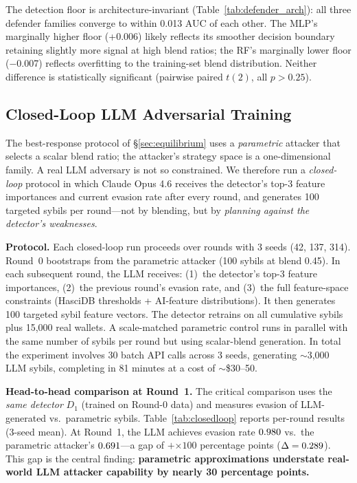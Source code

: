 \documentclass[sigconf,nonacm=false]{acmart}
\begin{document}
The detection floor is architecture-invariant (Table~\ref{tab:defender_arch}): all three defender families converge to within 0.013 AUC of each other. The MLP's marginally higher floor (+0.006) likely reflects its smoother decision boundary retaining slightly more signal at high blend ratios; the RF's marginally lower floor ($-$0.007) reflects overfitting to the training-set blend distribution. Neither difference is statistically significant (pairwise paired $t(2)$, all $p > 0.25$).

\subsection{Closed-Loop LLM Adversarial Training}
\label{sec:closedloop}

The best-response protocol of \S\ref{sec:equilibrium} uses a \emph{parametric} attacker that selects a scalar blend ratio; the attacker's strategy space is a one-dimensional family.
A real LLM adversary is not so constrained.
We therefore run a \emph{closed-loop} protocol in which Claude Opus 4.6 receives the detector's top-3 feature importances and current evasion rate after every round, and generates 100 targeted sybils per round---not by blending, but by \textit{planning against the detector's weaknesses}.

\noindent\textbf{Protocol.}
Each closed-loop run proceeds over \bestResponseNRounds{} rounds with 3 seeds (42, 137, 314).
Round~0 bootstraps from the parametric attacker (100 sybils at blend 0.45).
In each subsequent round, the LLM receives:
(1)~the detector's top-3 feature importances,
(2)~the previous round's evasion rate, and
(3)~the full feature-space constraints (HasciDB thresholds + AI-feature distributions).
It then generates 100 targeted sybil feature vectors.
The detector retrains on all cumulative sybils plus 15,000 real wallets.
A scale-matched parametric control runs in parallel with the same number of sybils per round but using scalar-blend generation.
In total the experiment involves 30 batch API calls across 3 seeds, generating ${\sim}$3,000 LLM sybils, completing in 81 minutes at a cost of ${\sim}$\$30--50.

\noindent\textbf{Head-to-head comparison at Round~1.}
The critical comparison uses the \emph{same detector} $D_1$ (trained on Round-0 data) and measures evasion of LLM-generated vs.\ parametric sybils.
Table~\ref{tab:closedloop} reports per-round results (3-seed mean).
At Round~1, the LLM achieves evasion rate $0.980{}$ vs.\ the parametric attacker's $0.691{}$---a gap of $+$\closedLoopRoundEvasionDelta{}$\times 100$ percentage points ($\Delta = 0.289{}$).
This gap is the central finding: \textbf{parametric approximations understate real-world LLM attacker capability by nearly 30 percentage points.}
\end{document}
